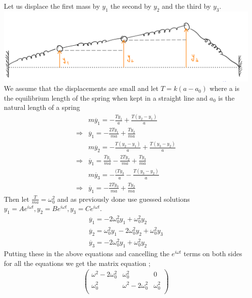 \documentclass[addpoints]{exam}
\begin{document}
\begin{questions}
\begin{solution}
    Let us displace the first mass by $y_1$ the second by $y_2$ and the third by $y_3$.\\
    \includegraphics[width = 5.0 in]{q4ans.png}\\ 
    We assume that the displacements are small and let $T = k(a-a_0)$ where a is the equilibrium length of the spring when kept in a straight line and $a_0$ is the natural length of a spring\\ 
    \begin{align*}
        &m\ddot{y_1} = -\frac{Ty_1}{a} + \frac{T(y_2-y_1)}{a}\\ 
        \Rightarrow & \ddot{y_1} = -\frac{2Ty_1}{ma} + \frac{Ty_2}{ma}\\
        &m\ddot{y_2} = -\frac{T(y_2-y_1)}{a} + \frac{T(y_3-y_2)}{a}\\ 
        \Rightarrow & \ddot{y_1} = \frac{Ty_1}{ma} - \frac{2Ty_2}{ma} + \frac{Ty_3}{ma}\\
        &m\ddot{y_3} = -\frac{(Ty_3}{a} - \frac{T(y_3-y_2)}{a}\\ 
        \Rightarrow & \ddot{y_1} = -\frac{2Ty_3}{ma} + \frac{Ty_2}{ma}
    \end{align*}
    Then let $\frac{T}{ma} = \omega_0^2$ and as previously done use guessed solutions $y_1 = Ae^{i\omega t},  y_2 = Be^{i\omega t},y_3 = Ce^{i\omega t}$. 
    \begin{align}
         \ddot{y_1} = -2\omega_0^2y_1 + \omega_0^2y_2\\
         \ddot{y_2} = \omega_0^2y_1 - 2\omega_0^2y_2 + \omega_0^2y_3\\
         \ddot{y_3} = -2\omega_0^2y_1 + \omega_0^2y_2
    \end{align}
    Putting these in the above equations and cancelling the $e^{i\omega t}$ terms on both sides for all the equations we get the matrix equation ;
    \begin{align*}
        \begin{pmatrix}
            \omega ^{2} -2\omega _{0}^{2} & \omega _{0}^{2} & 0\\
            \omega _{0}^{2} & \omega ^{2} -2\omega _{0}^{2} & \omega _{0}^{2}\\

\end{pmatrix}
\end{align*}
\end{solution}
\end{questions}
\end{document}
